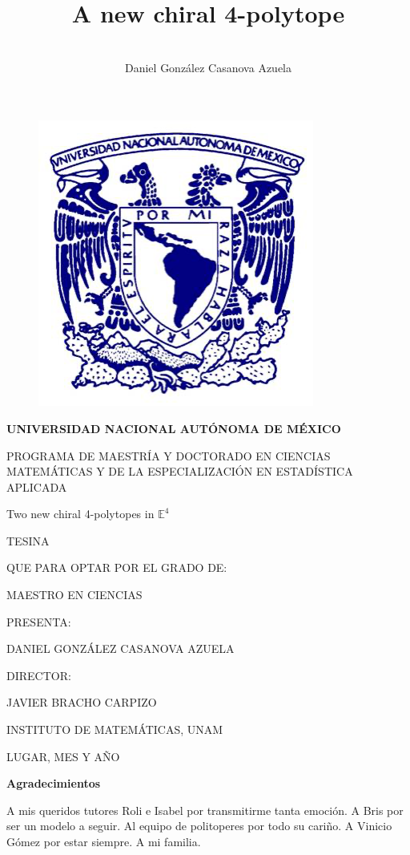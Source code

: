 \documentclass{article}
\title{A new chiral 4-polytope}
\author{\\Daniel González Casanova Azuela}
\date{}
\theoremstyle{definition}
\newcommand{\E}{\mathbb{E}}
\begin{document}
\thispagestyle{empty}
\begin{figure}[H]
	\centering
	\includegraphics[width=0.3\linewidth]{img1}
\end{figure}

\begin{center}
	\textbf{UNIVERSIDAD NACIONAL AUTÓNOMA DE MÉXICO}
	
	PROGRAMA DE MAESTRÍA Y DOCTORADO EN CIENCIAS MATEMÁTICAS Y DE LA ESPECIALIZACIÓN EN ESTADÍSTICA APLICADA
	
	\vspace{2cm}
	{\Large Two new chiral 4-polytopes in $\E^4$}
	\vspace{1.2cm}
	
	TESINA
	
	QUE PARA OPTAR POR EL GRADO DE:
	
	MAESTRO EN CIENCIAS
	\vspace{1.2cm}
	
	PRESENTA:
	
	DANIEL GONZÁLEZ CASANOVA AZUELA
	\vspace{1.2cm}
	
	DIRECTOR:
	
	JAVIER BRACHO CARPIZO
	
	INSTITUTO DE MATEMÁTICAS, UNAM
	\vspace{1.2cm}
	
	LUGAR, MES Y AÑO
\end{center}

\clearpage

\begin{changemargin}{3.3cm}{0cm} 

\vspace*{4cm}

{\Large\textbf{Agradecimientos}}
\vspace{1cm}

A mis queridos tutores Roli e Isabel por transmitirme tanta emoción. A Bris por ser un modelo a seguir. Al equipo de politoperes por todo su cariño. A Vinicio Gómez por estar siempre. A mi familia.
\end{changemargin}
\clearpage
	
\end{document}
